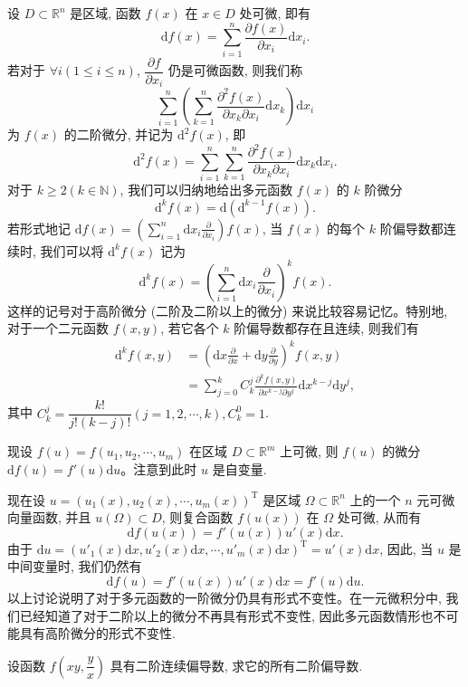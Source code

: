 设 $D\subset\mathbb R^n$ 是区域, 函数 $f(x)$ 在 $x\in D$ 处可微, 即有
\[
  \mathrm df(x)=\sum_{i=1}^n\frac{\partial f(x)}{\partial x_i}\mathrm dx_i.
\]
若对于 $\forall i(1\leqslant i\leqslant n)$, $\dfrac{\partial f}{\partial x_i}$ 仍是可微函数, 则我们称
\[
  \sum_{i=1}^n\left(\sum_{k=1}^n
  \frac{\partial^2 f(x)}{\partial x_k\partial x_i}\mathrm dx_k\right)\mathrm dx_i
\]
为 $f(x)$ 的二阶微分, 并记为 $\mathrm d^2f(x)$, 即
\[
  \mathrm d^2f(x)=\sum_{i=1}^n\sum_{k=1}^n
  \frac{\partial^2 f(x)}{\partial x_k\partial x_i}\mathrm dx_k\mathrm dx_i.
\]
对于 $k\geqslant2(k\in\mathbb N)$, 我们可以归纳地给出多元函数 $f(x)$ 的 $k$ 阶微分
\[
  \mathrm d^kf(x)=\mathrm d(\mathrm d^{k-1}f(x)).
\]
若形式地记 $\mathrm df(x)=\left(\sum_{i=1}^n\mathrm dx_i\frac{\partial}{\partial x_i}\right)f(x)$, 当 $f(x)$ 的每个 $k$ 阶偏导数都连续时, 我们可以将 $\mathrm d^kf(x)$ 记为
\[
  \mathrm d^kf(x)=\left(\sum_{i=1}^n\mathrm dx_i\frac{\partial}{\partial x_i}\right)^kf(x).
\]
这样的记号对于高阶微分 (二阶及二阶以上的微分) 来说比较容易记忆。特别地, 对于一个二元函数 $f(x,y)$, 若它各个 $k$ 阶偏导数都存在且连续, 则我们有
\[
\begin{aligned}
  \mathrm d^kf(x,y)
  &=\left(\mathrm dx\frac{\partial}{\partial x}
  +\mathrm dy\frac{\partial}{\partial y}\right)^kf(x,y)\\
  &=\sum_{j=0}^k C_k^j
  \frac{\partial^k f(x,y)}{\partial x^{k-j}\partial y^j}
  \mathrm dx^{k-j}\mathrm dy^j,
\end{aligned}
\]
其中 $C_k^j=\dfrac{k!}{j!(k-j)!}(j=1,2,\cdots,k),C_k^0=1$.

现设 $f(u)=f(u_1,u_2,\cdots,u_m)$ 在区域 $D\subset\mathbb R^m$ 上可微, 则 $f(u)$ 的微分 $\mathrm df(u)=f'(u)\mathrm du$。注意到此时 $u$ 是自变量.

现在设 $u=(u_1(x),u_2(x),\cdots,u_m(x))^\mathrm T$ 是区域 $\Omega\subset\mathbb R^n$ 上的一个 $n$ 元可微向量函数, 并且 $u(\Omega)\subset D$, 则复合函数 $f(u(x))$ 在 $\Omega$ 处可微, 从而有
\[
  \mathrm df(u(x))=f'(u(x))u'(x)\mathrm dx.
\]
由于 $\mathrm du=(u'_1(x)\mathrm dx,u'_2(x)\mathrm dx,\cdots,u'_m(x)\mathrm dx)^\mathrm T=u'(x)\mathrm dx$, 因此, 当 $u$ 是中间变量时, 我们仍然有
\[
  \mathrm df(u)=f'(u(x))u'(x)\mathrm dx=f'(u)\mathrm du.
\]
以上讨论说明了对于多元函数的一阶微分仍具有形式不变性。在一元微积分中, 我们已经知道了对于二阶以上的微分不再具有形式不变性, 因此多元函数情形也不可能具有高阶微分的形式不变性.

\begin{example}\label{example:ma-14-2-10}
设函数 $f\left(xy,\dfrac yx\right)$ 具有二阶连续偏导数, 求它的所有二阶偏导数.
\end{example}



